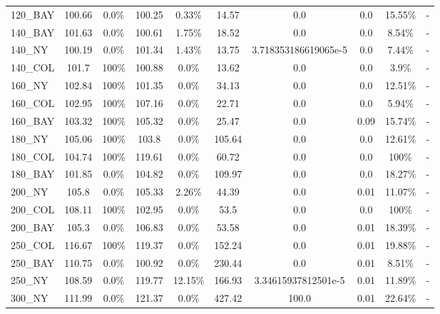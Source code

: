 \documentclass[main.tex]{subfiles}
\begin{document}
\begin{center}
\begin{tabular}{lccccccccc}
120\_BAY & 100.66 & 0.0\% & 100.25 & 0.33\% & 14.57 & 0.0 & 0.0 & 15.55\% & - \\
140\_BAY & 101.63 & 0.0\% & 100.61 & 1.75\% & 18.52 & 0.0 & 0.0 & 8.54\% & - \\
140\_NY & 100.19 & 0.0\% & 101.34 & 1.43\% & 13.75 & 3.718353186619065e-5 & 0.0 & 7.44\% & - \\
140\_COL & 101.7 &  100\%  & 100.88 & 0.0\% & 13.62 & 0.0 & 0.0 & 3.9\% & - \\
160\_NY & 102.84 &  100\%  & 101.35 & 0.0\% & 34.13 & 0.0 & 0.0 & 12.51\% & - \\
160\_COL & 102.95 &  100\%  & 107.16 & 0.0\% & 22.71 & 0.0 & 0.0 & 5.94\% & - \\
160\_BAY & 103.32 &  100\%  & 105.32 & 0.0\% & 25.47 & 0.0 & 0.09 & 15.74\% & - \\
180\_NY & 105.06 &  100\%  & 103.8 & 0.0\% & 105.64 & 0.0 & 0.0 & 12.61\% & - \\
180\_COL & 104.74 &  100\%  & 119.61 & 0.0\% & 60.72 & 0.0 & 0.0 &  100\%  & - \\
180\_BAY & 101.85 & 0.0\% & 104.82 & 0.0\% & 109.97 & 0.0 & 0.0 & 18.27\% & - \\
200\_NY & 105.8 & 0.0\% & 105.33 & 2.26\% & 44.39 & 0.0 & 0.01 & 11.07\% & - \\
200\_COL & 108.11 &  100\%  & 102.95 & 0.0\% & 53.5 & 0.0 & 0.0 &  100\%  & - \\
200\_BAY & 105.3 & 0.0\% & 106.83 & 0.0\% & 53.58 & 0.0 & 0.01 & 18.39\% & - \\
250\_COL & 116.67 &  100\%  & 119.37 & 0.0\% & 152.24 & 0.0 & 0.01 & 19.88\% & - \\
250\_BAY & 110.75 & 0.0\% & 100.92 & 0.0\% & 230.44 & 0.0 & 0.01 & 8.51\% & - \\
250\_NY & 108.59 & 0.0\% & 119.77 & 12.15\% & 166.93 & 3.34615937812501e-5 & 0.01 & 11.89\% & - \\
300\_NY & 111.99 & 0.0\% & 121.37 & 0.0\% & 427.42 & 100.0 & 0.01 & 22.64\% & - \\
\hline\end{tabular}
\end{center}
\newpage
\end{document}
